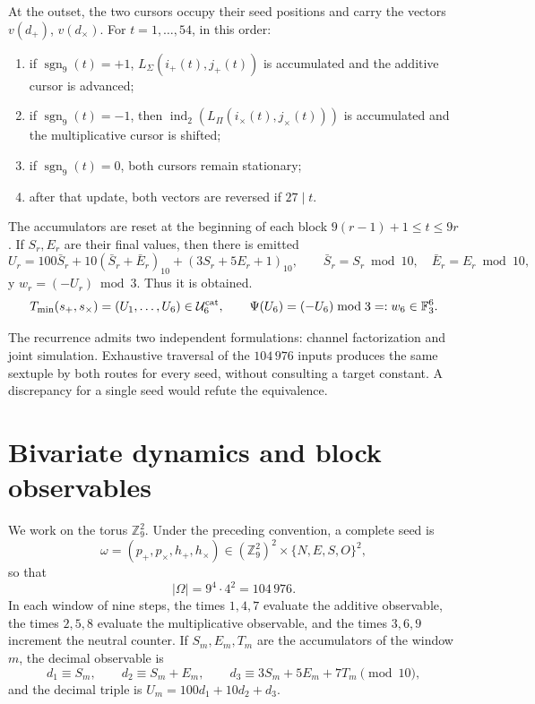 \begin{algorithm}
\label{pf84:E02-16}
At the outset, the two cursors occupy their seed positions and carry
the vectors \(v(d_+)\), \(v(d_\times)\). For
\(t=1,\ldots,54\), in this order:
\begin{enumerate}
  \item if \(\operatorname{sgn}_9(t)=+1\), \(L_\Sigma(i_+(t),j_+(t))\) is accumulated
  and the additive cursor is advanced;
  \item if \(\operatorname{sgn}_9(t)=-1\), then
  \(\operatorname{ind}_2(L_\Pi(i_\times(t),j_\times(t)))\) is accumulated and the
  multiplicative cursor is shifted;
  \item if \(\operatorname{sgn}_9(t)=0\), both cursors remain stationary;
  \item after that update, both vectors are reversed if
  \(27\mid t\).
\end{enumerate}
The accumulators are reset at the beginning of each block
\(9(r-1)+1\leq t\leq9r\). If \(S_r,E_r\) are their final values, then there is emitted
\[
 U_r=100\bar S_r+10(\bar S_r+\bar E_r)_{10}
       +(3S_r+5E_r+1)_{10},
 \qquad
 \bar S_r=S_r\bmod10,\quad \bar E_r=E_r\bmod10,
\]
y \(w_r=(-U_r)\bmod3\). Thus it is obtained.
\[
 T_{\min}(s_+,s_\times)=(U_1,\ldots,U_6)
 \in\mathcal U_6^{\rm cat},
 \qquad
 \Psi(U_6)=(-U_6)\bmod3=:w_6\in\mathbb F_3^6.
\]
\end{algorithm}

\begin{criterion} \label{pf84:E02-17} The recurrence admits two independent formulations: channel factorization and joint simulation. Exhaustive traversal of the \(104\,976\) inputs produces the same sextuple by both routes for every seed, without consulting a target constant. A discrepancy for a single seed would refute the equivalence.
\end{criterion}

\section{Bivariate dynamics and block observables}

We work on the torus \(\mathbb Z_9^2\). Under the preceding convention, a
complete seed is
\[
\omega=(p_+,p_\times,h_+,h_\times)
\in(\mathbb Z_9^2)^2\times\{N,E,S,O\}^2,
\]
so that
\[
|\Omega|=9^4\cdot4^2=104\,976.
\]
In each window of nine steps, the times \(1,4,7\) evaluate the additive observable,
the times \(2,5,8\) evaluate the multiplicative observable, and the times \(3,6,9\)
increment the neutral counter. If \(S_m,E_m,T_m\) are the accumulators
of the window \(m\), the decimal observable is
\[
d_1\equiv S_m,\qquad
d_2\equiv S_m+E_m,\qquad
d_3\equiv3S_m+5E_m+7T_m\pmod{10},
\]
and the decimal triple is \(U_m=100d_1+10d_2+d_3\).

